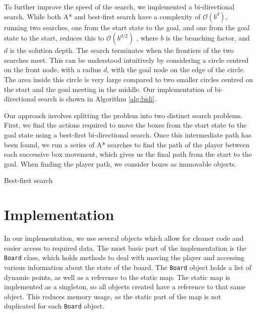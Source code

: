 \documentclass[a4paper,11pt]{article}
\begin{document}
To further improve the speed of the search, we implemented a bi-directional
search. While both A* and best-first search have a complexity of
$\mathcal{O}(b^d)$, running two searches, one from the start state to the goal,
and one from the goal state to the start, reduces this to $\mathcal{O}(b^{d/2})$
\cite{aima}, where $b$ is the branching factor, and $d$ is the solution
depth. The search terminates when the frontiers of the two searches meet. This
can be understood intuitively by considering a circle centred on the front node,
with a radius $d$, with the goal node on the edge of the circle. The area inside
this circle is very large compared to two smaller circles centred on the start
and the goal meeting in the middle. Our implementation of bi-directional search
is shown in Algorithm \ref{alg:bidi}.

Our approach involves splitting the problem into two distinct search
problems. First, we find the actions required to move the boxes from the start
state to the goal state using a best-first bi-directional search. Once this
intermediate path has been found, we run a series of A* searches to find the
path of the player between each successive box movement, which gives us the
final path from the start to the goal. When finding the player path, we consider
boxes as immovable objects.

\begin{algorithm}
  \DontPrintSemicolon
\caption{Best-first search}
\label{alg:bestfirst}
\end{algorithm}

\section{Implementation}
In our implementation, we use several objects which allow for cleaner code and
easier access to required data. The most basic part of the implementation is the
\texttt{Board} class, which holds methods to deal with moving the player and
accessing various information about the state of the board. The \texttt{Board}
object holds a list of dynamic points, as well as a reference to the static
map. The static map is implemented as a singleton, so all objects created have a
reference to that same object. This reduces memory usage, as the static part of
the map is not duplicated for each \texttt{Board} object.
\end{document}
